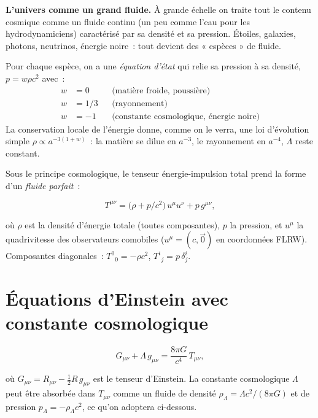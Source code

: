 \documentclass[11pt,a4paper,openany]{report}
\renewcommand{\v}{\vec}
\begin{document}
\begin{tcolorbox}[vulgarisation]
\textbf{L'univers comme un grand fluide.} À grande échelle on traite tout le
contenu cosmique comme un fluide continu (un peu comme l'eau pour les
hydrodynamiciens) caractérisé par sa densité et sa pression. Étoiles,
galaxies, photons, neutrinos, énergie noire~: tout devient des « espèces »
de fluide.
\end{tcolorbox}

\begin{tcolorbox}[mathspe]
Pour chaque espèce, on a une \emph{équation d'état} qui relie sa pression à
sa densité, $p = w\rho c^{2}$ avec~:
\[
\begin{aligned}
w &= 0     &&\text{(matière froide, poussière)} \\
w &= 1/3   &&\text{(rayonnement)} \\
w &= -1    &&\text{(constante cosmologique, énergie noire)}
\end{aligned}
\]
La conservation locale de l'énergie donne, comme on le verra, une loi
d'évolution simple $\rho \propto a^{-3(1+w)}$~: la matière se dilue
en $a^{-3}$, le rayonnement en $a^{-4}$, $\Lambda$ reste constant.
\end{tcolorbox}

Sous le principe cosmologique, le tenseur énergie-impulsion total prend la
forme d'un \emph{fluide parfait}~:

\begin{equation}
T^{\mu\nu} = \bigl(\rho + p/c^{2}\bigr)\,u^{\mu}u^{\nu} + p\,g^{\mu\nu},
\label{eq:T_perfect}
\end{equation}

\noindent où $\rho$ est la densité d'énergie totale (toutes composantes), $p$ la
pression, et $u^{\mu}$ la quadrivitesse des observateurs comobiles ($u^{\mu}=
(c,\v 0)$ en coordonnées FLRW). Composantes diagonales~:
$T^{0}{}_{0} = -\rho c^{2}$, $T^{i}{}_{j} = p\,\delta^{i}_{j}$.

\section{Équations d'Einstein avec constante cosmologique}

\begin{equation}
G_{\mu\nu} + \Lambda\,g_{\mu\nu}
   = \frac{8\pi G}{c^{4}}\,T_{\mu\nu},
\label{eq:Einstein}
\end{equation}

\noindent où $G_{\mu\nu} = R_{\mu\nu} - \tfrac{1}{2}R\,g_{\mu\nu}$ est le tenseur
d'Einstein. La constante cosmologique $\Lambda$ peut être absorbée dans
$T_{\mu\nu}$ comme un fluide de densité $\rho_{\Lambda} = \Lambda c^{2}/(8\pi G)$
et de pression $p_{\Lambda} = -\rho_{\Lambda} c^{2}$, ce qu'on adoptera ci-dessous.
\end{document}
